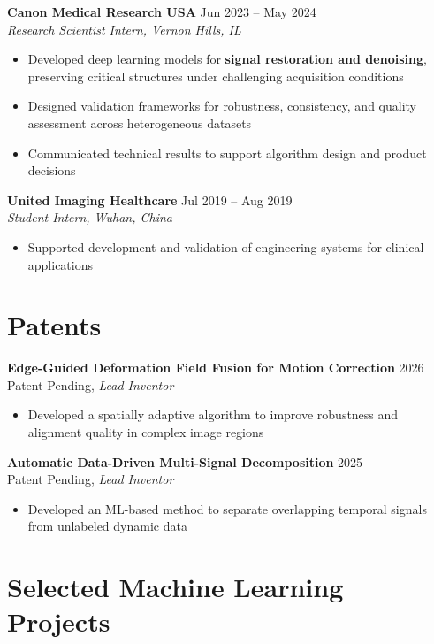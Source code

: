 \textbf{Canon Medical Research USA} \hfill Jun 2023 -- May 2024 \\
\textit{Research Scientist Intern, Vernon Hills, IL}
\begin{itemize}[leftmargin=*]
\item Developed deep learning models for \textbf{signal restoration and denoising}, preserving critical structures under challenging acquisition conditions
\item Designed validation frameworks for robustness, consistency, and quality assessment across heterogeneous datasets
\item Communicated technical results to support algorithm design and product decisions
\end{itemize}

\textbf{United Imaging Healthcare} \hfill Jul 2019 -- Aug 2019 \\
\textit{Student Intern, Wuhan, China}
\begin{itemize}[leftmargin=*]
\item Supported development and validation of engineering systems for clinical applications
\end{itemize}

\section{Patents}
\textbf{Edge-Guided Deformation Field Fusion for Motion Correction} \hfill 2026 \\
Patent Pending, \textit{Lead Inventor}
\begin{itemize}[leftmargin=*]
\item Developed a spatially adaptive algorithm to improve robustness and alignment quality in complex image regions
\end{itemize}

\textbf{Automatic Data-Driven Multi-Signal Decomposition} \hfill 2025 \\
Patent Pending, \textit{Lead Inventor}
\begin{itemize}[leftmargin=*]
\item Developed an ML-based method to separate overlapping temporal signals from unlabeled dynamic data
\end{itemize}

\section{Selected Machine Learning Projects}

